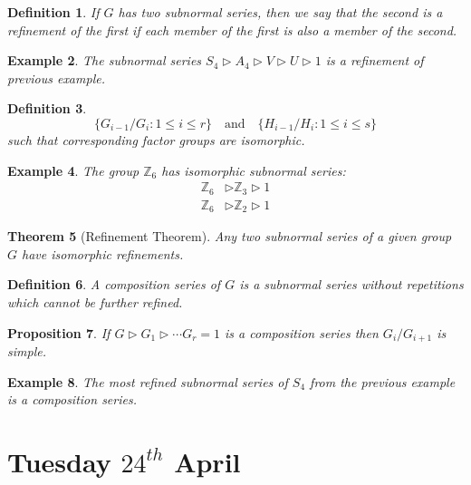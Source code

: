 \documentclass[a4paper,10pt]{article}
\newcommand{\ZZ}{\mathbb{Z}}
\newtheorem{thm}{Theorem}
\newtheorem{Def}[thm]{Definition}
\newtheorem{prop}[thm]{Proposition}
\newtheorem{eg}[thm]{Example}
\newtheorem{rem}[thm]{Remark}
\begin{document}
\begin{Def}
If $G$ has two subnormal series, then we say that the second is a refinement of the first if each member of the first is also a member of the second.
\end{Def}

\begin{eg}
The subnormal series $S_4 \triangleright A_4 \triangleright V \triangleright U \triangleright 1$ is a refinement of previous example.
\end{eg}

\begin{Def}

\[ \{ G_{i-1} / G_i : 1 \leq i \leq r \} \quad \text{and} \quad \{ H_{i-1} / H_i : 1 \leq i \leq s \} \]
such that corresponding factor groups are isomorphic.
\end{Def}

\begin{eg}
The group $\ZZ_6$ has isomorphic subnormal series:
\begin{align*}
\ZZ_6 &\triangleright \ZZ_3 \triangleright 1 \\
\ZZ_6 &\triangleright \ZZ_2 \triangleright 1
\end{align*}
\end{eg}

\begin{thm}[Refinement Theorem]
Any two subnormal series of a given group $G$ have isomorphic refinements.
\end{thm}



\begin{Def}
A composition series of $G$ is a subnormal series without repetitions which cannot be further refined. 
\end{Def}

\begin{prop}
If $G \triangleright G_1 \triangleright \cdots G_r = 1$ is a composition series then $G_i / G_{i+1}$ is simple.
\end{prop}

\begin{eg}
The most refined subnormal series of $S_4$ from the previous example is a composition series.
\end{eg}




\newpage
\section{Tuesday $24^{th}$ April}
\end{document}
